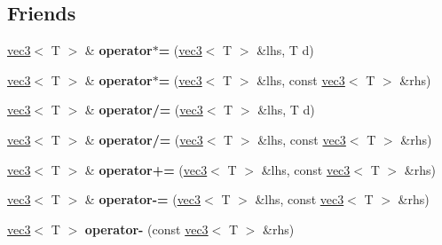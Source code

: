\subsection*{Friends}
\begin{DoxyCompactItemize}
\item 
\hypertarget{classnv_1_1vec3_a573e32ced446f83232eba6e5ea05861b}{}\label{classnv_1_1vec3_a573e32ced446f83232eba6e5ea05861b} 
\hyperlink{classnv_1_1vec3}{vec3}$<$ T $>$ \& {\bfseries operator$\ast$=} (\hyperlink{classnv_1_1vec3}{vec3}$<$ T $>$ \&lhs, T d)
\item 
\hypertarget{classnv_1_1vec3_ad31ba8e621bcfefb698bcd943f2c3a68}{}\label{classnv_1_1vec3_ad31ba8e621bcfefb698bcd943f2c3a68} 
\hyperlink{classnv_1_1vec3}{vec3}$<$ T $>$ \& {\bfseries operator$\ast$=} (\hyperlink{classnv_1_1vec3}{vec3}$<$ T $>$ \&lhs, const \hyperlink{classnv_1_1vec3}{vec3}$<$ T $>$ \&rhs)
\item 
\hypertarget{classnv_1_1vec3_a844bafa4fa80f32b5a32ab17950f5485}{}\label{classnv_1_1vec3_a844bafa4fa80f32b5a32ab17950f5485} 
\hyperlink{classnv_1_1vec3}{vec3}$<$ T $>$ \& {\bfseries operator/=} (\hyperlink{classnv_1_1vec3}{vec3}$<$ T $>$ \&lhs, T d)
\item 
\hypertarget{classnv_1_1vec3_a8c22ebf703a1c1fe718cf72023ca948c}{}\label{classnv_1_1vec3_a8c22ebf703a1c1fe718cf72023ca948c} 
\hyperlink{classnv_1_1vec3}{vec3}$<$ T $>$ \& {\bfseries operator/=} (\hyperlink{classnv_1_1vec3}{vec3}$<$ T $>$ \&lhs, const \hyperlink{classnv_1_1vec3}{vec3}$<$ T $>$ \&rhs)
\item 
\hypertarget{classnv_1_1vec3_a303b24b77b45822f74d4a5fbcd5a9158}{}\label{classnv_1_1vec3_a303b24b77b45822f74d4a5fbcd5a9158} 
\hyperlink{classnv_1_1vec3}{vec3}$<$ T $>$ \& {\bfseries operator+=} (\hyperlink{classnv_1_1vec3}{vec3}$<$ T $>$ \&lhs, const \hyperlink{classnv_1_1vec3}{vec3}$<$ T $>$ \&rhs)
\item 
\hypertarget{classnv_1_1vec3_a06765bb69def0a8d02cb1fa99dfe6d64}{}\label{classnv_1_1vec3_a06765bb69def0a8d02cb1fa99dfe6d64} 
\hyperlink{classnv_1_1vec3}{vec3}$<$ T $>$ \& {\bfseries operator-\/=} (\hyperlink{classnv_1_1vec3}{vec3}$<$ T $>$ \&lhs, const \hyperlink{classnv_1_1vec3}{vec3}$<$ T $>$ \&rhs)
\item 
\hypertarget{classnv_1_1vec3_a40e1814c396466ba80b3f31e41508134}{}\label{classnv_1_1vec3_a40e1814c396466ba80b3f31e41508134} 
\hyperlink{classnv_1_1vec3}{vec3}$<$ T $>$ {\bfseries operator-\/} (const \hyperlink{classnv_1_1vec3}{vec3}$<$ T $>$ \&rhs)
\item 
\hypertarget{classnv_1_1vec3_a8f8d95ac2a92eb4a9592592f08d25941}{}\label{classnv_1_1vec3_a8f8d95ac2a92eb4a9592592f08d25941} 

\end{DoxyCompactItemize}

